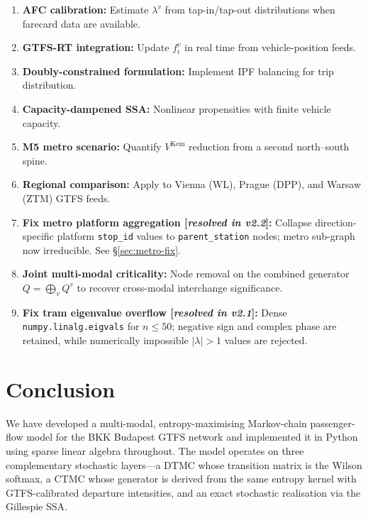 \documentclass[11pt,a4paper]{article}
\theoremstyle{plain}
\theoremstyle{definition}
\theoremstyle{remark}
\begin{document}
\begin{enumerate}
  \item \textbf{AFC calibration:} Estimate $\lambda^v$ from tap-in/tap-out
    distributions when farecard data are available.
  \item \textbf{GTFS-RT integration:} Update $f^v_i$ in real time from
    vehicle-position feeds.
  \item \textbf{Doubly-constrained formulation:} Implement IPF balancing
    for trip distribution.
  \item \textbf{Capacity-dampened SSA:} Nonlinear propensities with finite
    vehicle capacity.
  \item \textbf{M5 metro scenario:} Quantify $V^{\mathrm{Kem}}$ reduction
    from a second north--south spine.
  \item \textbf{Regional comparison:} Apply to Vienna (WL), Prague (DPP),
    and Warsaw (ZTM) GTFS feeds.
  \item[\ding{51}] \textbf{Fix metro platform aggregation
    [\emph{resolved in v2.2}]:} Collapse direction-specific platform \texttt{stop\_id}
    values to \texttt{parent\_station} nodes; metro sub-graph now irreducible.
    See \S\ref{sec:metro-fix}.
  \item \textbf{Joint multi-modal criticality:} Node removal on the combined
    generator $Q=\bigoplus_v Q^v$ to recover cross-modal interchange
    significance.
  \item[\ding{51}] \textbf{Fix tram eigenvalue overflow
    [\emph{resolved in v2.1}]:}
    Dense \texttt{numpy.linalg.eigvals} for $n\le50$; negative sign and complex
    phase are retained, while numerically impossible $|\lambda|>1$ values are rejected.
\end{enumerate}

\section{Conclusion}
\label{sec:conclusion}

We have developed a multi-modal, entropy-maximising Markov-chain
passenger-flow model for the BKK Budapest GTFS network and implemented it in
Python using sparse linear algebra throughout.  The model operates on three
complementary stochastic layers---a DTMC whose transition matrix is the Wilson
softmax, a CTMC whose generator is derived from the same entropy kernel with
GTFS-calibrated departure intensities, and an exact stochastic realisation via
the Gillespie SSA.
\end{document}
